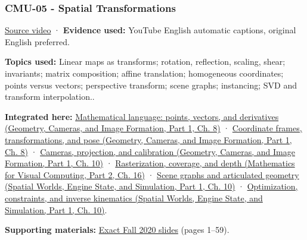 \subsubsection{CMU-05 - Spatial Transformations}\label{04-visual-computing-ii-ch036-cmu-05---spatial-transformations}

\hypertarget{04-visual-computing-ii-ch036-cmu-05---spatial-transformations}{}

\href{https://www.youtube.com/watch?v=QmFBHSJS0Gw}{Source video} · \textbf{Evidence used:} YouTube English automatic captions, original English preferred.

\textbf{Topics used:} Linear maps as transforms; rotation, reflection, scaling, shear; invariants; matrix composition; affine translation; homogeneous coordinates; points versus vectors; perspective transform; scene graphs; instancing; SVD and transform interpolation..

\textbf{Integrated here:} \href{../03-Geometry-Cameras-and-Image-Formation-P01/main.pdf\#nameddest=03-visual-computing-i-ch001-mathematical-language-points-vectors-and-derivatives}{Mathematical language: points, vectors, and derivatives (Geometry, Cameras, and Image Formation, Part 1, Ch. 8)} · \href{../03-Geometry-Cameras-and-Image-Formation-P01/main.pdf\#nameddest=03-visual-computing-i-ch001-coordinate-frames-transformations-and-pose}{Coordinate frames, transformations, and pose (Geometry, Cameras, and Image Formation, Part 1, Ch. 8)} · \href{../03-Geometry-Cameras-and-Image-Formation-P01/main.pdf\#nameddest=03-visual-computing-i-ch003-cameras-projection-and-calibration}{Cameras, projection, and calibration (Geometry, Cameras, and Image Formation, Part 1, Ch. 10)} · \href{../02-Mathematics-for-Visual-Computing-P02/main.pdf\#nameddest=03-visual-computing-i-ch012-rasterization-coverage-and-depth}{Rasterization, coverage, and depth (Mathematics for Visual Computing, Part 2, Ch. 16)} · \href{../05-Spatial-Worlds-Engine-State-and-Simulation-P01/main.pdf\#nameddest=04-visual-computing-ii-ch029-scene-graphs-and-articulated-geometry}{Scene graphs and articulated geometry (Spatial Worlds, Engine State, and Simulation, Part 1, Ch. 10)} · \href{../05-Spatial-Worlds-Engine-State-and-Simulation-P01/main.pdf\#nameddest=04-visual-computing-ii-ch029-optimization-constraints-and-inverse-kinematics}{Optimization, constraints, and inverse kinematics (Spatial Worlds, Engine State, and Simulation, Part 1, Ch. 10)}.

\textbf{Supporting materials:} \href{https://15462.courses.cs.cmu.edu/fall2020content/lectures/05_transformations/05_transformations_slides.pdf}{Exact Fall 2020 slides} (pages 1--59).

